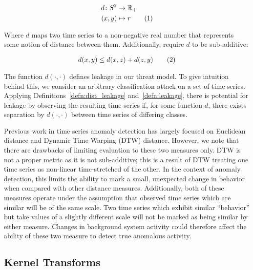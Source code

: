 \documentclass[a4paper]{article}
\newcommand\numberthis{\addtocounter{equation}{1}\tag{\theequation}}
\begin{document}
\begin{align*}
    d \colon S^2 &\to \mathbb{R}_{+}\\
    (x,y) &\mapsto r \numberthis
\end{align*}

Where $d$ maps two time series to a non-negative real number that represents some notion of distance between them.
Additionally, require $d$ to be sub-additive:

\begin{align*}
    d(x,y) \le d(x,z) + d(z,y) \numberthis
\end{align*}


The function $d(\cdot,\cdot)$ defines leakage in our threat model.
To give intuition behind this, we consider an arbitrary classification attack on a set of time series.
Applying Definitions~\ref{defn:dist_leakage} and~\ref{defn:leakage}, there is potential for leakage by observing the resulting time series if, for some function $d$, there exists separation by $d(\cdot, \cdot)$ between time series of differing classes.




Previous work in time series anomaly detection has largely focused on Euclidean distance and Dynamic Time Warping (DTW) distance.
However, we note that there are drawbacks of limiting evaluation to these two measures only.
DTW is not a proper metric as it is not sub-additive; this is a result of DTW treating one time series as non-linear time-stretched of the other.
In the context of anomaly detection, this limits the ability to mark a small, unexpected change in behavior when compared with other distance measures.
Additionally, both of these measures operate under the assumption that observed time series which are similar will be of the same scale.
Two time series which exhibit similar ``behavior'' but take values of a slightly different scale will not be marked as being similar by either measure.
Changes in background system activity could therefore affect the ability of these two measure to detect true anomalous activity.

\subsection{Kernel Transforms}
\end{document}
